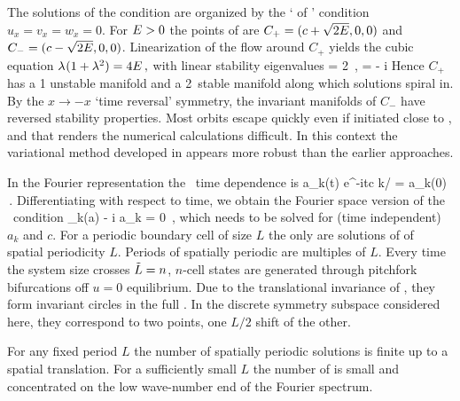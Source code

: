 The solutions of the {\eqv}  condition
 are
organized by the
`{\eqva}  of {\eqva}'  condition
\( u_x= v_x= w_x= 0 \).
    For $E>0$ the {\reqva}  points of  are
$C_{+}=(c+\sqrt{2E},0,0)$ and $C_{-}=(c-\sqrt{2E},0,0)$.
Linearization of the flow around $C_{+}$ yields the cubic equation
$ %
\eigExp(1+\eigExp^2) = 4 \expctE
\,,
$ %
with linear stability eigenvalues
\beq
\eigExp[1] = 2 \eigRe
    \,,\qquad
\eigExp[2,3] = - \eigRe \pm i \eigIm
{}
Hence $C_{+}$ has a {1\dmn}
unstable manifold and a 2\dmn\ stable manifold
along which solutions spiral in.
By the $x \to -x$ `time reversal' symmetry, the
invariant manifolds of $C_{-}$
have reversed stability properties.
Most orbits escape quickly even if initiated close to \eqva, and that
renders the numerical calculations
difficult.
In this context the variational method
developed in 
appears more robust than
the earlier approaches.


%

In the Fourier representation the \reqva\ time
dependence is
\beq
 a_k(t) e^{-itc k/\tildeL} = a_k(0)
\,.
Differentiating with respect to time, we obtain
the Fourier space version of the \reqv\ condition
\beq
 \pVeloc_k(a) - i  a_k = 0
\,,
which needs to be solved for (time independent) $a_k$ and $c$.
For a periodic boundary cell of size
$L$ the only {\eqva}  are
solutions of  of spatial periodicity $L$.
Periods of spatially periodic {\eqva} are multiples of $L$.
Every time the system size crosses  $\tilde{L}=n$,
$n$-cell states
are generated through pitchfork bifurcations off $u =0$
equilibrium.
Due to the translational invariance of {\KSe},
they form invariant circles
in the full \statesp.
In the discrete symmetry subspace considered here,
they correspond to two points, one $L/2$ shift of the other.

For any fixed period $L$ the number
of spatially periodic solutions is finite up to a spatial translation.
For a sufficiently small $L$
the number of {\eqva} is small and
concentrated on the low wave-number end of the Fourier spectrum.

